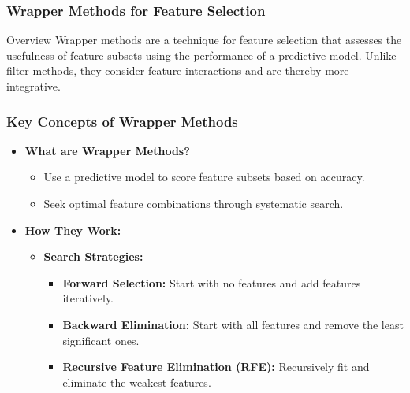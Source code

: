 \documentclass[aspectratio=169]{beamer}
\begin{document}
\begin{frame}[fragile]
  \frametitle{Wrapper Methods for Feature Selection}
  \begin{block}{Overview}
      Wrapper methods are a technique for feature selection that assesses the usefulness of feature subsets using the performance of a predictive model. Unlike filter methods, they consider feature interactions and are thereby more integrative.
  \end{block}
\end{frame}

\begin{frame}[fragile]
  \frametitle{Key Concepts of Wrapper Methods}
  \begin{itemize}
    \item \textbf{What are Wrapper Methods?}
      \begin{itemize}
        \item Use a predictive model to score feature subsets based on accuracy.
        \item Seek optimal feature combinations through systematic search.
      \end{itemize}
    
    \item \textbf{How They Work:}
      \begin{itemize}
        \item \textbf{Search Strategies:}
          \begin{itemize}
            \item \textbf{Forward Selection:} Start with no features and add features iteratively.
            \item \textbf{Backward Elimination:} Start with all features and remove the least significant ones.
            \item \textbf{Recursive Feature Elimination (RFE):} Recursively fit and eliminate the weakest features.
          \end{itemize}
      \end{itemize}
  \end{itemize}
\end{frame}
\end{document}
